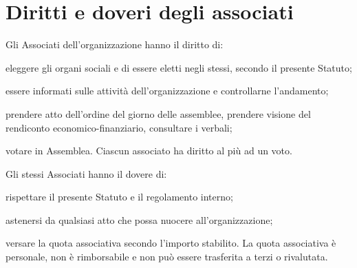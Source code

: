 \documentclass[legalpaper, 11pt]{exam}
\let\tempone\enumerate
\let\temptwo\endenumerate
\renewenvironment{enumerate}{\tempone\addtolength{\itemsep}{-0.45\baselineskip}}{\temptwo}
\begin{document}
{\section{Diritti e doveri degli associati}
\begin{enumerate}
 \item Gli Associati dell'organizzazione hanno il diritto di:
 \vspace{-5pt}
 \begin{enumerate}
  \item eleggere gli organi sociali e di essere eletti negli stessi, secondo il presente Statuto;
  \item essere informati sulle attività dell’organizzazione e controllarne l’andamento;
  \item prendere atto dell’ordine del giorno delle assemblee, prendere visione del rendiconto economico-finanziario, consultare i verbali;
  \item votare in Assemblea. Ciascun associato ha diritto al più ad un voto.
 \end{enumerate}
\item Gli stessi Associati hanno il dovere di:
\vspace{-5pt}
\begin{enumerate}
 \item rispettare il presente Statuto e il regolamento interno;
 \item astenersi da qualsiasi atto che possa nuocere all’organizzazione;
 \item versare la quota associativa secondo l’importo stabilito. La quota associativa è personale, non è rimborsabile e non può essere trasferita a terzi o rivalutata.
\end{enumerate}

\end{enumerate}

}
\end{document}
